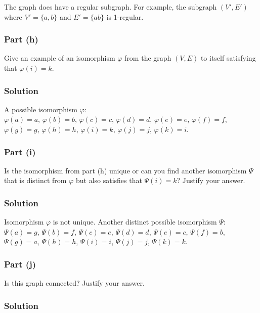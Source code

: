 \documentclass[12pt]{article}
\begin{document}
The graph does have a regular subgraph. For example, the subgraph $(V', E')$ where $V' = \{ a, b \}$ and $E' = \{ ab \}$ is 1-regular.

\pagebreak
\subsubsection*{Part (h)}

Give an example of an isomorphism $\varphi$ from the graph $(V,E)$ to itself satisfying that $\varphi(i) = k$.

\subsubsection*{Solution}

A possible isomorphism $\varphi$:\\
$\varphi(a) = a$, $\varphi(b) = b$, $\varphi(c) = c$, $\varphi(d) = d$, $\varphi(e) = e$, $\varphi(f) = f$,
$\varphi(g) = g$, $\varphi(h) = h$, $\varphi(i) = k$, $\varphi(j) = j$, $\varphi(k) = i$.

\subsubsection*{Part (i)}

Is the isomorphism from part (h) unique or can you find another isomorphism $\Psi$ that is distinct from $\varphi$ but also satisfies that $\Psi(i) = k$? Justify your answer.

\subsubsection*{Solution}

Isomorphism $\varphi$ is not unique. Another distinct possible isomorphism $\Psi$:\\
$\Psi(a) = g$, $\Psi(b) = f$, $\Psi(c) = e$, $\Psi(d) = d$, $\Psi(e) = c$, $\Psi(f) = b$,
$\Psi(g) = a$, $\Psi(h) = h$, $\Psi(i) = i$, $\Psi(j) = j$, $\Psi(k) = k$.

\subsubsection*{Part (j)}

Is this graph connected? Justify your answer.

\subsubsection*{Solution}
\end{document}
